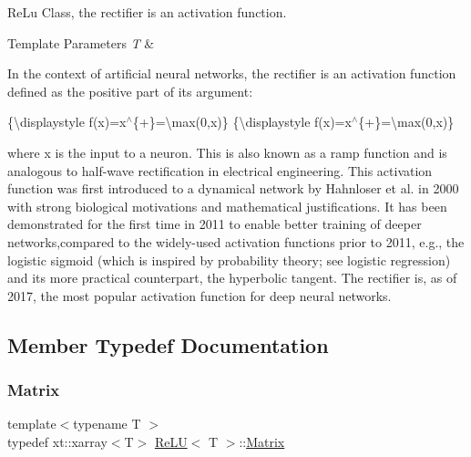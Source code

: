 Re\+Lu Class, the rectifier is an activation function. 


\begin{DoxyTemplParams}{Template Parameters}
{\em T} & \\
\hline
\end{DoxyTemplParams}
In the context of artificial neural networks, the rectifier is an activation function defined as the positive part of its argument\+:

\{\textbackslash{}displaystyle f(x)=x$^\wedge$\{+\}=\textbackslash{}max(0,x)\} \{\textbackslash{}displaystyle f(x)=x$^\wedge$\{+\}=\textbackslash{}max(0,x)\}

where x is the input to a neuron. This is also known as a ramp function and is analogous to half-\/wave rectification in electrical engineering. This activation function was first introduced to a dynamical network by Hahnloser et al. in 2000 with strong biological motivations and mathematical justifications. It has been demonstrated for the first time in 2011 to enable better training of deeper networks,compared to the widely-\/used activation functions prior to 2011, e.\+g., the logistic sigmoid (which is inspired by probability theory; see logistic regression) and its more practical counterpart, the hyperbolic tangent. The rectifier is, as of 2017, the most popular activation function for deep neural networks. 

\subsection{Member Typedef Documentation}
\mbox{\label{class_re_l_u_a3d1448f06335a4ab7227ec31a43a410f}} 
\subsubsection{\texorpdfstring{Matrix}{Matrix}}
{\footnotesize\ttfamily template$<$typename T $>$ \\
typedef xt\+::xarray$<$T$>$ \mbox{\hyperlink{class_re_l_u}{Re\+LU}}$<$ T $>$\+::\mbox{\hyperlink{class_re_l_u_a3d1448f06335a4ab7227ec31a43a410f}{Matrix}}}

\mbox{\label{class_re_l_u_ae27e6aba0a09baa85b8ef8679db42719}} 
